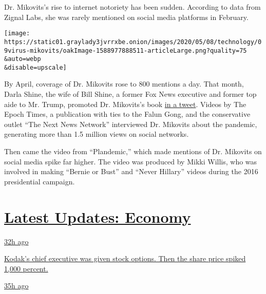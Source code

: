 Dr. Mikovits's rise to internet notoriety has been sudden. According to
data from Zignal Labs, she was rarely mentioned on social media
platforms in February.

\texttt{[image: https://static01.graylady3jvrrxbe.onion/images/2020/05/08/technology/09virus-mikovits/oakImage-1588977888511-articleLarge.png?quality=75\\\&auto=webp\\\&disable=upscale]}

By April, coverage of Dr. Mikovits rose to 800 mentions a day. That
month, Darla Shine, the wife of Bill Shine, a former Fox News executive
and former top aide to Mr. Trump, promoted Dr. Mikovits's book
\href{https://twitter.com/DarlaShine/status/1246607755915526144}{in a
tweet}. Videos by The Epoch Times, a publication with ties to the Falun
Gong, and the conservative outlet ``The Next News Network'' interviewed
Dr. Mikovits about the pandemic, generating more than 1.5 million views
on social networks.

Then came the video from ``Plandemic,'' which made mentions of Dr.
Mikovits on social media spike far higher. The video was produced by
Mikki Willis, who was involved in making ``Bernie or Bust'' and ``Never
Hillary'' videos during the 2016 presidential campaign.

\hypertarget{latest-updates-economy}{%
\section{\texorpdfstring{\href{https://www.nytimes3xbfgragh.onion/live/2020/07/31/business/stock-market-today-coronavirus?action=click\&pgtype=Article\&state=default\&region=MAIN_CONTENT_1\&context=storylines_live_updates}{Latest
Updates:
Economy}}{Latest Updates: Economy}}\label{latest-updates-economy}}

\href{https://www.nytimes3xbfgragh.onion/live/2020/07/31/business/stock-market-today-coronavirus?action=click\&pgtype=Article\&state=default\&region=MAIN_CONTENT_1\&context=storylines_live_updates\#kodaks-chief-executive-was-given-stock-options-then-the-share-price-spiked-1000-percent}{32h
ago}

\href{https://www.nytimes3xbfgragh.onion/live/2020/07/31/business/stock-market-today-coronavirus?action=click\&pgtype=Article\&state=default\&region=MAIN_CONTENT_1\&context=storylines_live_updates\#kodaks-chief-executive-was-given-stock-options-then-the-share-price-spiked-1000-percent}{Kodak's
chief executive was given stock options. Then the share price spiked
1,000 percent.}

\href{https://www.nytimes3xbfgragh.onion/live/2020/07/31/business/stock-market-today-coronavirus?action=click\&pgtype=Article\&state=default\&region=MAIN_CONTENT_1\&context=storylines_live_updates\#fitch-ratings-downgrades-its-outlook-on-us-debt}{35h
ago}

